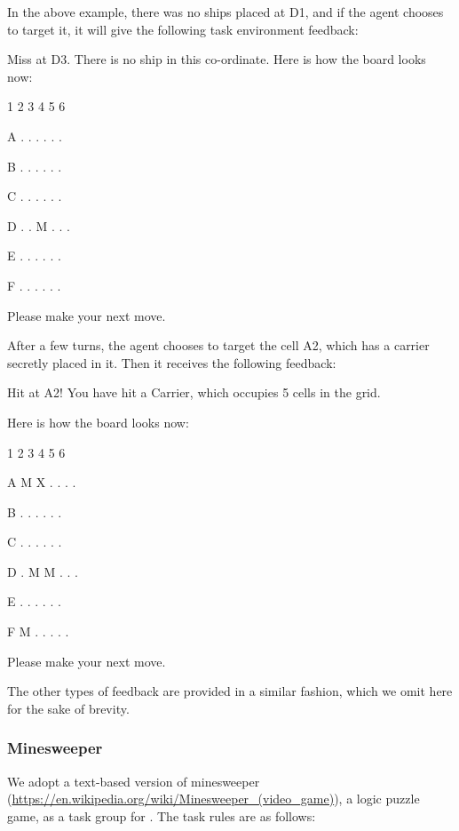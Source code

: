 In the above example, there was no ships placed at D1, and if the agent chooses to target it, it will give the following task environment feedback:

\begin{tcolorbox}[colback=gray!20, colframe=black, title=Battleship Environment Feedback Example 1]
Miss at D3. There is no ship in this co-ordinate. Here is how the board looks now: 

1  2  3  4  5  6

A   .  .  .  .  .  .

B   .  .  .  .  .  .

C   .  .  .  .  .  .

D   .  .  M  .  .  .

E   .  .  .  .  .  .

F   .  .  .  .  .  .

Please make your next move.
\end{tcolorbox}

After a few turns, the agent chooses to target the cell A2, which has a carrier secretly placed in it. Then it receives the following feedback:

\begin{tcolorbox}[colback=gray!20, colframe=black, title=Battleship Environment Feedback Example 2]
Hit at A2! You have hit a Carrier, which occupies 5 cells in the grid.

Here is how the board looks now: 

1  2  3  4  5  6

A   M  X  .  .  .  .

B   .  .  .  .  .  .

C   .  .  .  .  .  .

D   .  M  M  .  .  .

E   .  .  .  .  .  .

F   M  .  .  .  .  .

Please make your next move.
\end{tcolorbox}

The other types of feedback are provided in a similar fashion, which we omit here for the sake of brevity.

\newpage

\subsubsection{Minesweeper}

We adopt a text-based version of minesweeper (\url{https://en.wikipedia.org/wiki/Minesweeper_(video_game)}), a logic puzzle game, as a task group for \ours{}. The task rules are as follows:

